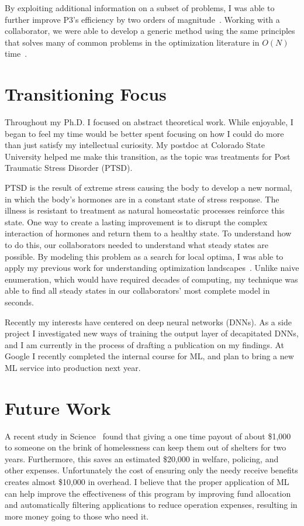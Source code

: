 \documentclass[a4paper, 11pt]{article}
\begin{document}
By exploiting additional information on a subset of problems, I was able to further
improve P3's efficiency by two orders of magnitude~\cite{goldman:2015:GBO}.
Working with a collaborator, we were able to develop a generic method using the same principles
that solves many of common problems in the optimization literature in $O(N)$ time~\cite{whitley:2016:mkl}.

\section{Transitioning Focus}
Throughout my Ph.D. I focused on abstract theoretical work. While enjoyable, I began to feel my time would be
better spent focusing on how I could do more than just satisfy my intellectual curiosity.
My postdoc at Colorado State University helped me make this transition, as the topic was treatments for
Post Traumatic Stress Disorder (PTSD).

PTSD is the result of extreme stress causing the body to develop a new
normal, in which the body's hormones are in a constant state of stress response. The illness is resistant
to treatment as natural homeostatic processes reinforce this state. One way to create a lasting improvement
is to disrupt the complex interaction of hormones and return them to a healthy state. To understand how to
do this, our collaborators needed to understand what steady states are possible. By modeling this problem as a search for local optima,
I was able to apply my previous work for understanding optimization landscapes~\cite{goldman:2016:hyperplane}.
Unlike naive enumeration, which would have required decades of computing, my technique was able to find
all steady states in our collaborators' most complete model in seconds.


Recently my interests have centered on deep neural networks (DNNs). As a side project I
investigated new ways of training the output layer of decapitated DNNs, and I am currently in the
process of drafting a publication on my findings. At Google I recently completed the internal course
for ML, and plan to bring a new ML service into production next year.

\section{Future Work}
A recent study in Science~\cite{evans:2016:homelessness} found that
giving a one time payout of about \$1,000 to someone on the brink of homelessness
can keep them out of shelters for two years. Furthermore, this saves an estimated
\$20,000 in welfare, policing, and other expenses. Unfortunately the cost
of ensuring only the needy receive benefits creates almost \$10,000 in overhead.
I believe that the proper application of ML can help improve the effectiveness
of this program by improving fund allocation and automatically filtering applications
to reduce operation expenses, resulting in more money going to those who need it.
\end{document}
